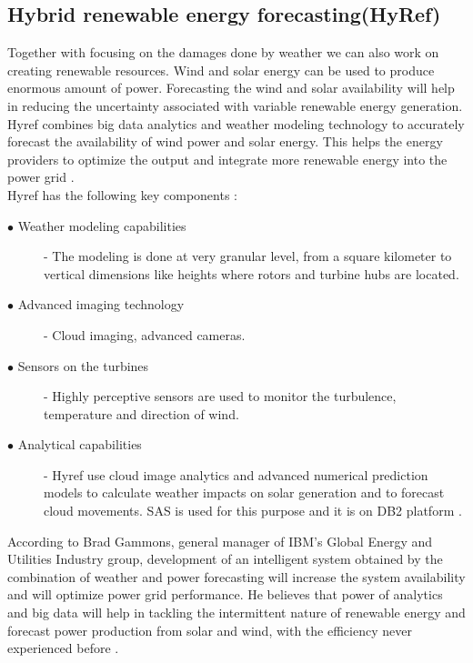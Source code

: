 \documentclass[sigconf]{acmart}
\begin{document}
\subsection{Hybrid renewable energy forecasting(HyRef)}


Together with focusing on the damages done by weather we can also work on creating renewable resources. Wind and solar energy can be used to produce enormous amount of power. Forecasting the wind and solar availability will help in reducing the uncertainty associated with variable renewable energy generation.
Hyref combines big data analytics and weather modeling technology to accurately forecast the availability of wind power and solar energy. This helps the  energy providers to optimize the output and integrate more renewable energy into the power grid \cite{Hyref02}.\\

Hyref has the following key components :\\

\begin{description}

\item [$\bullet$ Weather modeling capabilities]- The modeling is done at very granular level, from a square kilometer to vertical dimensions like heights where rotors and turbine hubs are located.

\item [$\bullet$ Advanced imaging technology]- Cloud imaging, advanced cameras.

\item [$\bullet$ Sensors on the turbines]- Highly perceptive sensors are used to monitor the turbulence, temperature and direction of wind.

\item [$\bullet$ Analytical capabilities]- Hyref use cloud image analytics and advanced numerical prediction models to calculate weather impacts on solar generation and to forecast cloud movements. SAS is used for this purpose and it is on DB2 platform \cite{Hyref04}.\\

\end{description}


According to Brad Gammons, general manager of IBM's Global Energy and Utilities Industry group, development of an intelligent system obtained by the combination of weather and power forecasting will increase the system availability and will optimize power grid performance. He believes that power of analytics and big data will help in tackling the intermittent nature of renewable energy and forecast power production from solar and wind, with the efficiency never experienced before \cite{Hyref03}.
\end{document}
